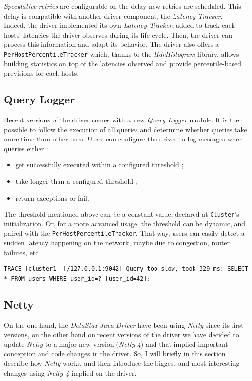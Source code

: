 \documentclass[a4paper]{report}
\newcommand{\djd}{\emph{DataStax Java Driver\xspace}}
\begin{document}
\emph{Speculative retries} are configurable on the delay new retries are scheduled. This delay is compatible with another driver component, the \emph{Latency Tracker}.\\
Indeed, the driver implemented its own \emph{Latency Tracker}, added to track each hosts' latencies the driver observes during its life-cycle. Then, the driver can process this information and adapt its behavior. The driver also offers a \verb;PerHostPercentileTracker; which, thanks to the \emph{HdrHistogram} library, allows building statistics on top of the latencies observed and provide percentile-based previsions for each hosts.

\subsection{Query Logger}
Recent versions of the driver comes with a new \emph{Query Logger} module. It is then possible to follow the execution of all queries and determine whether queries take more time than other ones. Users can configure the driver to log messages when queries either :
\begin{itemize}
   \item get successfully executed within a configured threshold ;
   \item take longer than a configured threshold ;
   \item return exceptions or fail.
\end{itemize}
The threshold mentioned above can be a constant value, declared at \verb;Cluster;'s initialization. Or, for a more advanced usage, the threshold can be dynamic, and paired with the \verb;PerHostPercentileTracker;. That way, users can easily detect a sudden latency happening on the network, maybe due to congestion, router failures, etc.
\begin{lstlisting}[label=ql-ex-1, caption=Query Logger live action, style=Java]
TRACE [cluster1] [/127.0.0.1:9042] Query too slow, took 329 ms: SELECT * FROM users WHERE user_id=? [user_id=42];
\end{lstlisting}

\subsection{Netty}
On the one hand, the \djd{} have been using \emph{Netty} since its first versions, on the other hand on recent versions of the driver we have decided to update \emph{Netty} to a major new version (\emph{Netty 4}) and that implied important conception and code changes in the driver. So, I will briefly in this section describe how \emph{Netty} works, and then introduce the biggest and most interesting changes using \emph{Netty 4} implied on the driver.
\end{document}
